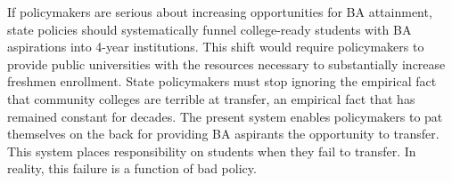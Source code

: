 \documentclass[twoside]{article}
\begin{document}
If policymakers are serious about increasing opportunities for BA attainment, state policies should systematically funnel college-ready students with BA aspirations into 4-year institutions.  This shift would require policymakers to provide public universities with the resources necessary to substantially increase freshmen enrollment. State policymakers must stop ignoring the empirical fact that community colleges are terrible at transfer, an empirical fact that has remained constant for decades. The present system enables policymakers to pat themselves on the back for providing BA aspirants the opportunity to transfer.  This system places responsibility on students when they fail to transfer. In reality, this failure is a function of bad policy.


\end{document}

